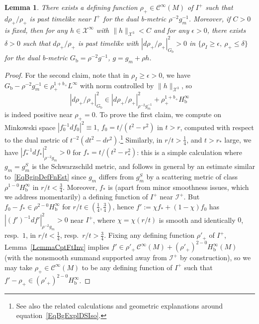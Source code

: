 \documentclass[reqno,11pt,letterpaper]{amsart}
\numberwithin{equation}{section}
\numberwithin{figure}{section}
\newtheorem{lemma}[thm]{Lemma}
\theoremstyle{definition}
\theoremstyle{remark}
\newcommand{\mc}{\mathcal}
\newcommand{\cC}{\mc C}
\newcommand{\cX}{\mc X}
\newcommand{\ms}{\mathscr}
\newcommand{\scri}{\ms I}
\newcommand{\eps}{\epsilon}
\newcommand{\bop}{{\mathrm{b}}}
\newcommand{\CI}{\cC^\infty}
\newcommand{\Hb}{H_{\bop}}
\begin{document}
\begin{lemma}
\label{LemmaBgipDefFn}
  There exists a defining function $\rho_+\in\CI(M)$ of $I^+$ such that $d\rho_+/\rho_+$ is past timelike near $I^+$ for the dual b-metric $\rho^{-2}g_m^{-1}$. Moreover, if $C>0$ is fixed, then for any $h\in\cX^\infty$ with $\|h\|_{\cX^3}<C$ and for any $\eps>0$, there exists $\delta>0$ such that $d\rho_+/\rho_+$ is past timelike with $|d\rho_+/\rho_+|_{G_\bop}^2>0$ in $\{\rho_I\geq\eps,\ \rho_+\leq\delta\}$ for the dual b-metric $G_\bop=\rho^{-2}g^{-1}$, $g=g_m+\rho h$.
\end{lemma}
\begin{proof}
  For the second claim, note that in $\rho_I\geq\eps>0$, we have $G_\bop-\rho^{-2}g_m^{-1}\in\rho_+^{1+b_+}L^\infty$ with norm controlled by $\|h\|_{\cX^3}$, so
  \begin{equation}
  \label{EqBgipDefFnEst}
    |d\rho_+/\rho_+|_{G_\bop}^2 \in |d\rho_+/\rho_+|^2_{\rho^{-2}g_m^{-1}} + \rho_+^{1+b_+}\Hb^\infty
  \end{equation}
  is indeed positive near $\rho_+=0$. To prove the first claim, we compute on Minkowski space $|f_0^{-1}d f_0|^2\equiv 1$, $f_0=t/(t^2-r^2)$ in $t>r$, computed with respect to the dual metric of $t^{-2}(dt^2-dr^2)$.\footnote{See also the related calculations and geometric explanations around equation~\eqref{EqBgExplDSIso}.} Similarly, in $r/t>\tfrac14$, and $t>r_*$ large, we have $|f_*^{-1}d f_*|_{\rho^{-2}g_m}^2>0$ for $f_*=t/(t^2-r_*^2)$: this is a simple calculation where $g_m=g_m^S$ is the Schwarzschild metric, and follows in general by an estimate similar to~\eqref{EqBgipDefFnEst} since $g_m$ differs from $g_m^S$ by a scattering metric of class $\rho^{1-0}\Hb^\infty$ in $r/t<\tfrac34$. Moreover, $f_*$ is (apart from minor smoothness issues, which we address momentarily) a defining function of $I^+$ near $\scri^+$. But $f_0-f_*\in\rho^{2-0}\Hb^\infty$ for $r/t\in(\tfrac14,\tfrac34)$, hence $f':=\chi f_*+(1-\chi)f_0$ has $|(f')^{-1}d f'|_{\rho^{-2}g_m}^2>0$ near $I^+$, where $\chi=\chi(r/t)$ is smooth and identically $0$, resp.\ $1$, in $r/t<\tfrac14$, resp.\ $r/t>\tfrac34$. Fixing any defining function $\rho'_+$ of $I^+$, Lemma~\ref{LemmaCptFtInv} implies $f'\in\rho'_+\,\CI(M)+(\rho'_+)^{2-0}\Hb^\infty(M)$ (with the nonsmooth summand supported away from $\scri^+$ by construction), so we may take $\rho_+\in\CI(M)$ to be any defining function of $I^+$ such that $f'-\rho_+\in(\rho'_+)^{2-0}\Hb^\infty$.
\end{proof}
\end{document}
